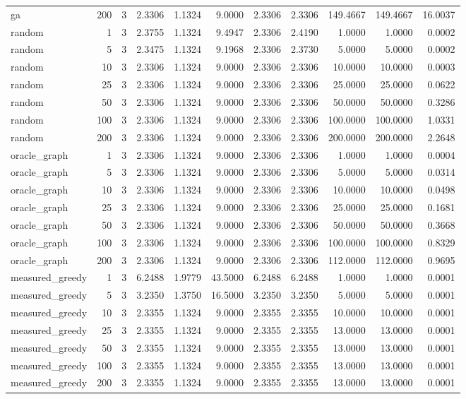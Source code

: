 \begin{table}[t]
\begin{tabular}{lrrrrrrrrrr}
ga & 200 & 3 & 2.3306 & 1.1324 & 9.0000 & 2.3306 & 2.3306 & 149.4667 & 149.4667 & 16.0037 \\
random & 1 & 3 & 2.3755 & 1.1324 & 9.4947 & 2.3306 & 2.4190 & 1.0000 & 1.0000 & 0.0002 \\
random & 5 & 3 & 2.3475 & 1.1324 & 9.1968 & 2.3306 & 2.3730 & 5.0000 & 5.0000 & 0.0002 \\
random & 10 & 3 & 2.3306 & 1.1324 & 9.0000 & 2.3306 & 2.3306 & 10.0000 & 10.0000 & 0.0003 \\
random & 25 & 3 & 2.3306 & 1.1324 & 9.0000 & 2.3306 & 2.3306 & 25.0000 & 25.0000 & 0.0622 \\
random & 50 & 3 & 2.3306 & 1.1324 & 9.0000 & 2.3306 & 2.3306 & 50.0000 & 50.0000 & 0.3286 \\
random & 100 & 3 & 2.3306 & 1.1324 & 9.0000 & 2.3306 & 2.3306 & 100.0000 & 100.0000 & 1.0331 \\
random & 200 & 3 & 2.3306 & 1.1324 & 9.0000 & 2.3306 & 2.3306 & 200.0000 & 200.0000 & 2.2648 \\
oracle\_graph & 1 & 3 & 2.3306 & 1.1324 & 9.0000 & 2.3306 & 2.3306 & 1.0000 & 1.0000 & 0.0004 \\
oracle\_graph & 5 & 3 & 2.3306 & 1.1324 & 9.0000 & 2.3306 & 2.3306 & 5.0000 & 5.0000 & 0.0314 \\
oracle\_graph & 10 & 3 & 2.3306 & 1.1324 & 9.0000 & 2.3306 & 2.3306 & 10.0000 & 10.0000 & 0.0498 \\
oracle\_graph & 25 & 3 & 2.3306 & 1.1324 & 9.0000 & 2.3306 & 2.3306 & 25.0000 & 25.0000 & 0.1681 \\
oracle\_graph & 50 & 3 & 2.3306 & 1.1324 & 9.0000 & 2.3306 & 2.3306 & 50.0000 & 50.0000 & 0.3668 \\
oracle\_graph & 100 & 3 & 2.3306 & 1.1324 & 9.0000 & 2.3306 & 2.3306 & 100.0000 & 100.0000 & 0.8329 \\
oracle\_graph & 200 & 3 & 2.3306 & 1.1324 & 9.0000 & 2.3306 & 2.3306 & 112.0000 & 112.0000 & 0.9695 \\
measured\_greedy & 1 & 3 & 6.2488 & 1.9779 & 43.5000 & 6.2488 & 6.2488 & 1.0000 & 1.0000 & 0.0001 \\
measured\_greedy & 5 & 3 & 3.2350 & 1.3750 & 16.5000 & 3.2350 & 3.2350 & 5.0000 & 5.0000 & 0.0001 \\
measured\_greedy & 10 & 3 & 2.3355 & 1.1324 & 9.0000 & 2.3355 & 2.3355 & 10.0000 & 10.0000 & 0.0001 \\
measured\_greedy & 25 & 3 & 2.3355 & 1.1324 & 9.0000 & 2.3355 & 2.3355 & 13.0000 & 13.0000 & 0.0001 \\
measured\_greedy & 50 & 3 & 2.3355 & 1.1324 & 9.0000 & 2.3355 & 2.3355 & 13.0000 & 13.0000 & 0.0001 \\
measured\_greedy & 100 & 3 & 2.3355 & 1.1324 & 9.0000 & 2.3355 & 2.3355 & 13.0000 & 13.0000 & 0.0001 \\
measured\_greedy & 200 & 3 & 2.3355 & 1.1324 & 9.0000 & 2.3355 & 2.3355 & 13.0000 & 13.0000 & 0.0001 \\
\bottomrule
\end{tabular}
\end{table}
